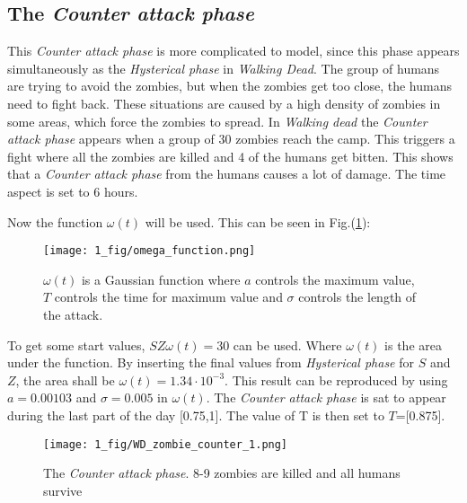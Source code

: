 \documentclass[%
twoside,                 %
final,                   %
chapterprefix=true,      %
open=right               %
10pt]{book}
\begin{document}
\subsection{The \emph{Counter attack phase}}
\label{section:counter_attack}
This \emph{Counter attack phase} is more complicated to model, since this phase appears simultaneously as the \emph{Hysterical phase} in \emph{Walking Dead}. The group of humans are trying to avoid the zombies, but when the zombies get too close, the humans need to fight back. These situations are caused by a high density of zombies in some areas, which force the zombies to spread. In \emph{Walking dead} the \emph{Counter attack phase} appears when a group of 30 zombies reach the camp. This triggers a fight where all the zombies are killed and 4 of the humans get bitten. This shows that a \emph{Counter attack phase} from the humans causes a lot of damage. The time aspect is set to 6 hours.  


\vspace{3mm}




\vspace{3mm}


Now the function $\omega(t)$ will be used. This can be seen in Fig.(\ref{fig:omega_function}):


\begin{figure}[ht]
  \centerline{\texttt{[image: 1\_fig/omega\_function.png]}}
  \caption{
  \label{fig:omega_function} $\omega (t)$ is a Gaussian function where $a$ controls the maximum value, $T$ controls the time for maximum value and $\sigma$ controls the length of the attack.
  }
\end{figure}


To get some start values, $SZ\omega(t)=30$ can be used. Where $\omega(t)$ is the area under the function. By inserting the final values from \emph{Hysterical phase} for $S$ and $Z$, the area shall be $\omega (t)=1.34\cdot10^{-3}$. This result can be reproduced by using $a= 0.00103$ and $\sigma = 0.005$ in $\omega(t)$. The \emph{Counter attack phase} is sat to appear during the last part of the day [0.75,1]. The value of T is then set to $T$=[0.875].


\begin{figure}[ht]
  \centerline{\texttt{[image: 1\_fig/WD\_zombie\_counter\_1.png]}}
  \caption{
  \label{fig:zombie_counter_1} The \emph{Counter attack phase}. 8-9 zombies are killed and all humans survive
  }
\end{figure}
\end{document}
